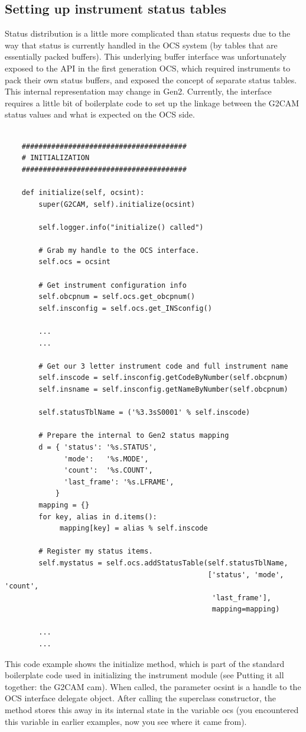 \documentclass[11pt]{report}
\begin{document}
\subsection{Setting up instrument status tables}
Status distribution is a little more complicated than status requests
due to the way that status is currently handled in the OCS system (by
tables that are essentially packed buffers). This underlying buffer
interface was unfortunately exposed to the API in the first generation
OCS, which required instruments to pack their own status buffers, and
exposed the concept of separate status tables. This internal
representation may change in Gen2. Currently, the interface requires a
little bit of boilerplate code to set up the linkage between the G2CAM
status values and what is expected on the OCS side. 
\begin{verbatim}

    #######################################
    # INITIALIZATION
    #######################################

    def initialize(self, ocsint):
        super(G2CAM, self).initialize(ocsint)

        self.logger.info("initialize() called")

        # Grab my handle to the OCS interface.
        self.ocs = ocsint

        # Get instrument configuration info
        self.obcpnum = self.ocs.get_obcpnum()
        self.insconfig = self.ocs.get_INSconfig()

        ...
        ...

        # Get our 3 letter instrument code and full instrument name
        self.inscode = self.insconfig.getCodeByNumber(self.obcpnum)
        self.insname = self.insconfig.getNameByNumber(self.obcpnum)
        
        self.statusTblName = ('%3.3sS0001' % self.inscode)

        # Prepare the internal to Gen2 status mapping
        d = { 'status': '%s.STATUS',
              'mode':   '%s.MODE',
              'count':  '%s.COUNT',
              'last_frame': '%s.LFRAME',
            }
        mapping = {}
        for key, alias in d.items():
             mapping[key] = alias % self.inscode

        # Register my status items.
        self.mystatus = self.ocs.addStatusTable(self.statusTblName,
                                                ['status', 'mode', 'count',
                                                 'last_frame'],
                                                 mapping=mapping)
        
        ...
        ...

\end{verbatim}
This code example shows the initialize method, which is part of the
standard boilerplate code used in initializing the instrument module
(see Putting it all together: the G2CAM cam). When called, the
parameter ocsint is a handle to the OCS interface delegate object. After
calling the superclass constructor, the method stores this away in its
internal state in the variable ocs (you encountered this variable in
earlier examples, now you see where it came from). 
\end{document}
